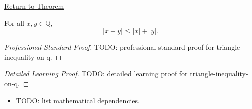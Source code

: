 \newpage
{}
\label{prf:triangle-inequality-on-q}

\begin{remark*}[Return]
\hyperref[thm:triangle-inequality-on-q]{Return to Theorem}
\end{remark*}

\begin{theorem*}
For all $x,y\in\mathbb{Q}$,
\[
|x+y|\le |x|+|y|.
\]
\end{theorem*}

\begin{proof}[Professional Standard Proof]
\LRAProofBodyStart
TODO: professional standard proof for triangle-inequality-on-q.
\end{proof}

\begin{proof}[Detailed Learning Proof]
\LRAProofBodyStart
TODO: detailed learning proof for triangle-inequality-on-q.
\end{proof}

\begin{remark*}
\end{remark*}

\begin{dependencies}
\begin{itemize}
  \item TODO: list mathematical dependencies.
\end{itemize}
\end{dependencies}

\clearpage
